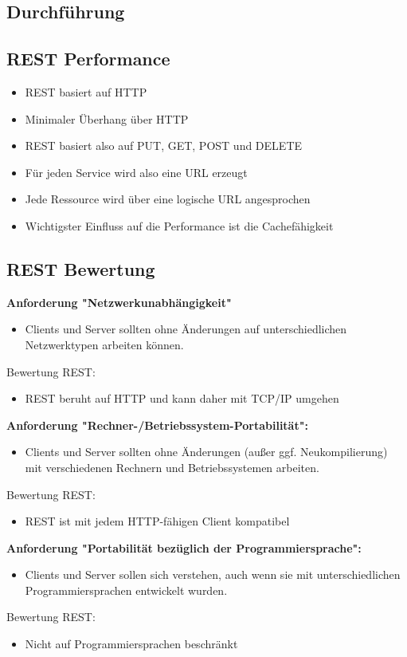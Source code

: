 \subsection{Durchführung}
\subsection{REST Performance}
\begin{itemize}
	\item REST basiert auf HTTP
	\item Minimaler Überhang über HTTP
	\item REST basiert also auf PUT, GET, POST und DELETE
	\item Für jeden Service wird also eine URL erzeugt
	\item Jede Ressource wird über eine logische URL angesprochen
	\item Wichtigster Einfluss auf die Performance ist die Cachefähigkeit
\end{itemize}

\subsection{REST Bewertung}
\textbf{Anforderung "Netzwerkunabhängigkeit"}
\begin{itemize}
	\item Clients und Server sollten ohne Änderungen auf unterschiedlichen Netzwerktypen arbeiten können.
\end{itemize}
Bewertung REST:
\begin{itemize}
	\item REST beruht auf HTTP und kann daher mit TCP/IP umgehen
\end{itemize}

\textbf{Anforderung "Rechner-/Betriebssystem-Portabilität":}
\begin{itemize}
	\item Clients und Server sollten ohne Änderungen (außer ggf. Neukompilierung) mit verschiedenen Rechnern und Betriebssystemen arbeiten.
\end{itemize}
Bewertung REST:
\begin{itemize}
	\item REST ist mit jedem HTTP-fähigen Client kompatibel
\end{itemize}

\textbf{Anforderung "Portabilität bezüglich der Programmiersprache":}
\begin{itemize}
	\item Clients und Server sollen sich verstehen, auch wenn sie mit unterschiedlichen Programmiersprachen entwickelt wurden.
\end{itemize}
Bewertung REST:
\begin{itemize}
	\item Nicht auf Programmiersprachen beschränkt
\end{itemize}

